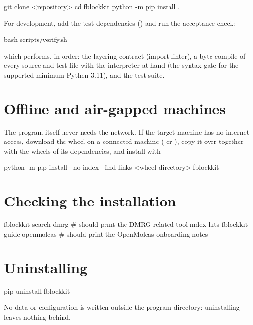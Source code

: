\begin{codeblock}
git clone <repository>
cd fblockkit
python -m pip install .
\end{codeblock}

For development, add the test dependencies ()
and run the acceptance check:

\begin{codeblock}
bash scripts/verify.sh
\end{codeblock}

which performs, in order: the layering contract (import-linter), a
byte-compile of every source and test file with the interpreter at hand (the
syntax gate for the supported minimum Python 3.11), and the test suite.

\section{Offline and air-gapped machines}

The program itself never needs the network. If the target machine has no
internet access, download the wheel on a connected machine
( or ), copy it over together
with the wheels of its dependencies, and install with

\begin{codeblock}
python -m pip install --no-index --find-links <wheel-directory> fblockkit
\end{codeblock}

\section{Checking the installation}

\begin{codeblock}
fblockkit search dmrg        # should print the DMRG-related tool-index hits
fblockkit guide openmolcas   # should print the OpenMolcas onboarding notes
\end{codeblock}

\section{Uninstalling}

\begin{codeblock}
pip uninstall fblockkit
\end{codeblock}

No data or configuration is written outside the program directory: uninstalling
leaves nothing behind.
